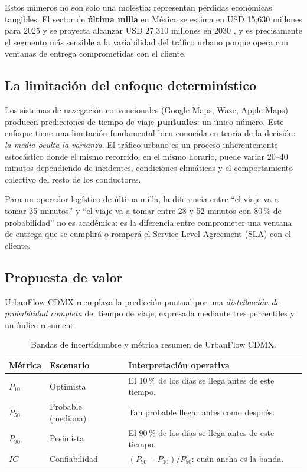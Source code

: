 \documentclass[11pt,a4paper]{article}
\begin{document}
Estos números no son solo una molestia: representan pérdidas económicas tangibles. El sector de \textbf{última milla} en México se estima en USD 15{,}630 millones para 2025 y se proyecta alcanzar USD 27{,}310 millones en 2030 \cite{mordor2025}, y es precisamente el segmento más sensible a la variabilidad del tráfico urbano porque opera con ventanas de entrega comprometidas con el cliente.

\subsection{La limitación del enfoque determinístico}

Los sistemas de navegación convencionales (Google Maps, Waze, Apple Maps) producen predicciones de tiempo de viaje \textbf{puntuales}: un único número. Este enfoque tiene una limitación fundamental bien conocida en teoría de la decisión: \textit{la media oculta la varianza}. El tráfico urbano es un proceso inherentemente estocástico donde el mismo recorrido, en el mismo horario, puede variar 20--40 minutos dependiendo de incidentes, condiciones climáticas y el comportamiento colectivo del resto de los conductores.

Para un operador logístico de última milla, la diferencia entre ``el viaje va a tomar 35 minutos'' y ``el viaje va a tomar entre 28 y 52 minutos con 80\,\% de probabilidad'' no es académica: es la diferencia entre comprometer una ventana de entrega que se cumplirá o romperá el Service Level Agreement (SLA) con el cliente.

\subsection{Propuesta de valor}

UrbanFlow CDMX reemplaza la predicción puntual por una \textit{distribución de probabilidad completa} del tiempo de viaje, expresada mediante tres percentiles y un índice resumen:

\begin{table}[H]
\centering
\small
\begin{tabular}{@{}llp{7.5cm}@{}}
\toprule
\textbf{Métrica} & \textbf{Escenario} & \textbf{Interpretación operativa} \\
\midrule
$P_{10}$ & Optimista & El 10\,\% de los días se llega antes de este tiempo. \\
$P_{50}$ & Probable (mediana) & Tan probable llegar antes como después. \\
$P_{90}$ & Pesimista & El 90\,\% de los días se llega antes de este tiempo. \\
$IC$ & Confiabilidad & $(P_{90}-P_{10})/P_{50}$: cuán ancha es la banda. \\
\bottomrule
\end{tabular}
\caption{Bandas de incertidumbre y métrica resumen de UrbanFlow CDMX.}
\label{tab:bandas}
\end{table}
\end{document}
